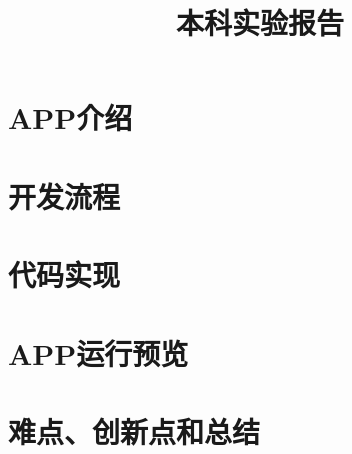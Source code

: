 \documentclass{zjureport}
\title{本科实验报告}
\date{\zhtoday}
\begin{document}
\makecover
\makeheader


\section{APP介绍}




\section{开发流程}




\section{代码实现}





\section{APP运行预览}




\section{难点、创新点和总结}
\end{document}
